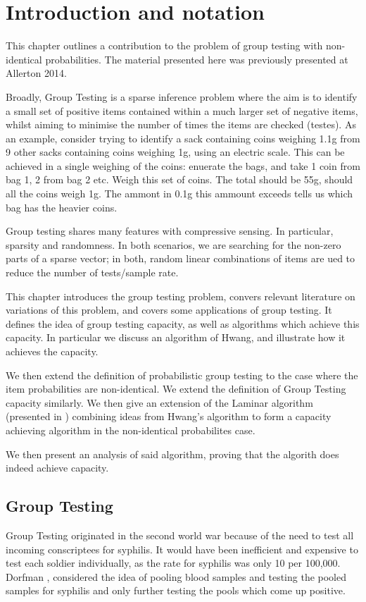 \section{Introduction and notation}
This chapter outlines a contribution to the problem of group testing with non-identical probabilities. The material presented here was previously presented at Allerton 2014. 

Broadly, Group Testing is a sparse inference problem where the aim is to identify a small set of positive items contained within a much larger set of negative items, whilst aiming to minimise the number of times the items are checked (testes). As an example, consider trying to identify a sack containing coins weighing 1.1g from 9 other sacks containing coins weighing 1g, using an electric scale. This can be achieved in a single weighing of the coins: enuerate the bags, and take 1 coin  from bag 1, 2 from bag 2 etc. Weigh this set of coins. The total should be 55g, should all the coins weigh 1g. The ammont in 0.1g this ammount exceeds tells us which bag has the heavier coins. 

Group testing shares many features with compressive sensing. In particular, sparsity and randomness. In both scenarios, we are searching for the non-zero parts of a sparse vector; in both, random linear combinations of items are ued to reduce the number of tests/sample rate.

This chapter introduces the group testing problem, convers relevant literature on variations of this problem, and covers some applications of group testing. It defines the idea of group testing capacity, as well as algorithms which achieve this capacity. In particular we discuss an algorithm of Hwang, and illustrate how it achieves the capacity. 

We then extend the definition of probabilistic group testing to the case where the item probabilities are non-identical. We extend the definition of Group Testing capacity similarly. We then give an extension of the Laminar algorithm (presented in \cite{li5}) combining ideas from Hwang's algorithm to form a capacity achieving algorithm in the non-identical probabilites case.

We then present an analysis of said algorithm, proving that the algorith does indeed achieve capacity. 


\subsection{Group Testing}
Group Testing originated in the second world war because of the need to test all incoming conscriptees for syphilis. It would have been inefficient and expensive to test each soldier individually, as the rate for syphilis was only 10 per 100,000. Dorfman \cite{Dorfman1943}, considered the idea of pooling blood samples and testing the pooled samples for syphilis and only further testing the pools which come up positive.

